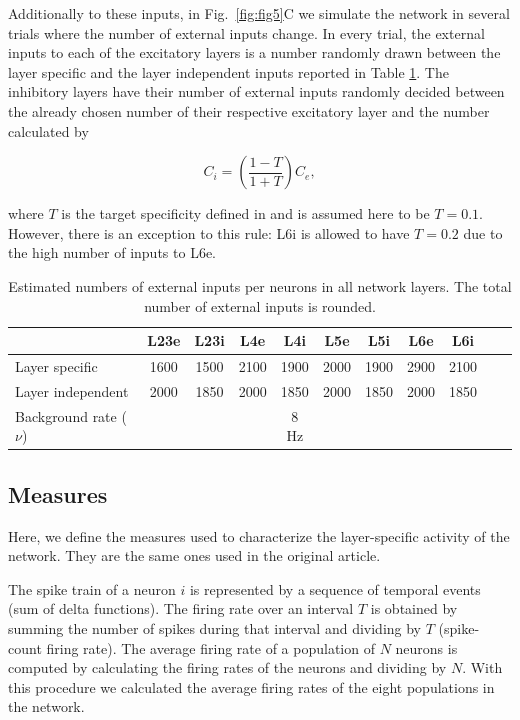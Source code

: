 \documentclass[10pt,a4paper,onecolumn]{article}
\begin{document}
Additionally to these inputs, in Fig.~\ref{fig:fig5}C we simulate the network in several trials where the number of external inputs change. In every trial, the external inputs to each of the excitatory layers is a number randomly drawn between the layer specific and the layer independent inputs reported in Table \ref{table:externalinput}. The inhibitory layers have their number of external inputs randomly decided between the already chosen number of their respective excitatory layer and the number calculated by 

\begin{equation}
\label{Eq:Ksyn_alt}
C_{i} = \left( \frac{1-T}{1+T} \right)C_{e} ,
\label{Eq:transitivity}
\end{equation}

\noindent where $T$ is the target specificity defined in \cite{potjans2014} and is assumed here to be $T=0.1$. However, there is an exception to this rule: L6i is allowed to have $T=0.2$ due to the high number of inputs to L6e.


\begin{table}[!ht]
\caption{\label{table:externalinput} Estimated numbers of external inputs per neurons in all network layers. The total number of external inputs is rounded.
}
\begin{center}
\begin{tabular}{lcccccccccc}
 \toprule
 \midrule
 & L23e & L23i & L4e & L4i & L5e & L5i & L6e & L6i
 \tabularnewline
 \midrule
 Layer specific & 1600 & 1500 & 2100 & 1900 & 2000 & 1900 & 2900 & 2100 \tabularnewline
 Layer independent & 2000 & 1850 & 2000 & 1850 & 2000 & 1850 & 2000 & 1850 \tabularnewline
 Background rate  ($\nu$) & & & & 8 Hz \tabularnewline
\bottomrule
\end{tabular}
\end{center}
\end{table}

\subsection{Measures}

Here, we define the measures used to characterize the layer-specific activity of the network. They are the same ones used in the original article.  

The spike train of a neuron $i$ is represented by a sequence of temporal events (sum of delta functions). The firing rate over an interval $T$ is obtained by summing the number of spikes during that interval and dividing by $T$ (spike-count firing rate). The average firing rate of a population of $N$ neurons is computed by calculating the firing rates of the neurons and dividing by $N$. With this procedure we calculated the average firing rates of the eight populations in the network.
\end{document}
